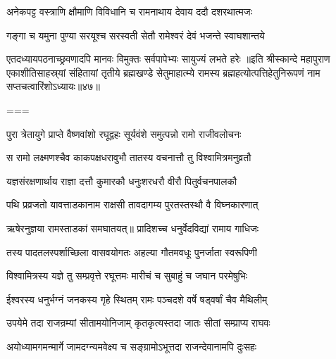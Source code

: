 \twolineshloka
{अनेकपट्ट वस्त्राणि क्षौमाणि विविधानि च}
{रामनाथाय देवाय ददौ दशरथात्मजः}%

\twolineshloka
{गङ्गा च यमुना पुण्या सरयूश्च सरस्वती}
{सेतौ रामेश्वरं देवं भजन्ते स्वाघशान्तये}%

\twolineshloka
{एतदध्यायपठनाच्छ्रवणादपि मानवः}
{विमुक्तः सर्वपापेभ्यः सायुज्यं लभते हरेः}%
॥इति श्रीस्कान्दे महापुराण एकाशीतिसाहस्र्यां संहितायां तृतीये ब्रह्मखण्डे सेतुमाहात्म्ये रामस्य ब्रह्महत्योत्पत्तिहेतुनिरूपणं नाम सप्तचत्वारिंशोऽध्यायः॥४७॥

===


\vakta{}
\shrota{}
\tags{}
\notes{}

\storymeta





\twolineshloka
{पुरा त्रेतायुगे प्राप्ते वैष्णवांशो रघूद्वहः}
{सूर्यवंशे समुत्पन्नो रामो राजीवलोचनः}%

\twolineshloka
{स रामो लक्ष्मणश्चैव काकपक्षधरावुभौ}
{तातस्य वचनात्तौ तु विश्वामित्रमनुव्रतौ}%

\twolineshloka
{यज्ञसंरक्षणार्थाय राज्ञा दत्तौ कुमारकौ}
{धनुःशरधरौ वीरौ पितुर्वचनपालकौ}%

\twolineshloka
{पथि प्रव्रजतो यावत्ताडकानाम राक्षसी}
{तावदागम्य पुरतस्तस्थौ वै विघ्नकारणात्}%


\twolineshloka
{ऋषेरनुज्ञया रामस्ताडकां समघातयत्॥}
{प्रादिशच्च धनुर्वेदविद्यां रामाय गाधिजः}%

\twolineshloka
{तस्य पादतलस्पर्शाच्छिला वासवयोगतः}
{अहल्या गौतमवधूः पुनर्जाता स्वरूपिणी}%


\twolineshloka
{विश्वामित्रस्य यज्ञे तु सम्प्रवृत्ते रघूत्तमः}
{मारीचं च सुबाहुं च जघान परमेषुभिः}%

\twolineshloka
{ईश्वरस्य धनुर्भग्नं जनकस्य गृहे स्थितम्}
{रामः पञ्चदशे वर्षे षड्वर्षां चैव मैथिलीम्}%

\twolineshloka
{उपयेमे तदा राजन्रम्यां सीतामयोनिजाम्}
{कृतकृत्यस्तदा जातः सीतां सम्प्राप्य राघवः}%

\twolineshloka
{अयोध्यामगमन्मार्गे जामदग्न्यमवेक्ष्य च}
{सङ्ग्रामोऽभूत्तदा राजन्देवानामपि दुःसहः}%

